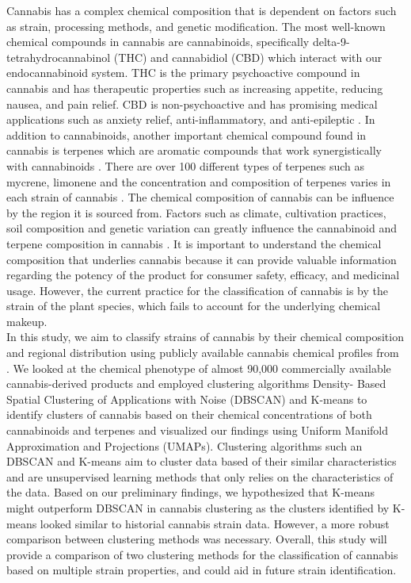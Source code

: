 \documentclass[11pt,a4paper]{article}
\newcommand{\noi}{\noindent}
\begin{document}
\noi
Cannabis has a complex chemical composition that is dependent on factors such as strain, processing methods, and genetic modification. The most well-known chemical compounds in cannabis are cannabinoids, specifically delta-9-tetrahydrocannabinol (THC) and cannabidiol (CBD) which interact with our endocannabinoid system. THC is the primary psychoactive compound in cannabis and has therapeutic properties such as increasing appetite, reducing nausea, and pain relief. CBD is non-psychoactive and has promising medical applications such as anxiety relief, anti-inflammatory, and anti-epileptic \cite{gonccalves2020terpenoids}. In addition to cannabinoids, another important chemical compound found in cannabis is terpenes which are aromatic compounds that work synergistically with cannabinoids \cite{russo2011taming}. There are over 100 different types of terpenes such as mycrene, limonene and the concentration and composition of terpenes varies in each strain of cannabis \cite{booth2019terpenes}. The chemical composition of cannabis can be influence by the region it is sourced from. Factors such as climate, cultivation practices, soil composition and genetic variation can greatly influence the cannabinoid and terpene composition in cannabis \cite{smith2022phytochemical}. It is important to understand the chemical composition that underlies cannabis because it can provide valuable information regarding the potency of the product for consumer safety, efficacy, and medicinal usage. However, the current practice for the classification of cannabis is by the strain of the plant species, which fails to account for the underlying chemical makeup.\\
 
\noi
In this study, we aim to classify strains of cannabis by their chemical composition and regional distribution using publicly available cannabis chemical profiles from \cite{smith2022phytochemical}. We looked at the chemical phenotype of almost 90,000 commercially available cannabis-derived products and employed clustering algorithms Density- Based Spatial Clustering of Applications with Noise (DBSCAN) and K-means to identify clusters of cannabis based on their chemical concentrations of both cannabinoids and terpenes and visualized our findings using Uniform Manifold Approximation and Projections (UMAPs). Clustering algorithms such an DBSCAN and K-means aim to cluster data based of their similar characteristics and are unsupervised learning methods that only relies on the characteristics of the data. Based on our preliminary findings, we hypothesized that K-means might outperform DBSCAN in cannabis clustering as the clusters identified by K-means looked similar to historial cannabis strain data. However, a more robust comparison between clustering methods was necessary. Overall, this study will provide a comparison of two clustering methods for the classification of cannabis based on multiple strain properties, and could aid in future strain identification. 
\end{document}
